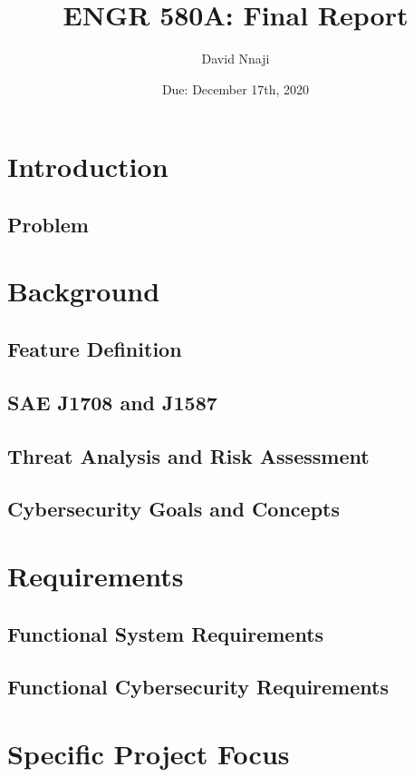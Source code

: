 
\title{ENGR 580A: Final Report}
\author{David Nnaji}
\date{Due: December 17th, 2020}


\maketitle

\section*{Introduction}
	\subsection{Problem}
\section{Background}
	\subsection{Feature Definition}
	\subsection{SAE J1708 and J1587}
	\subsection{Threat Analysis and Risk Assessment}
	\subsection{Cybersecurity Goals and Concepts}

\section{Requirements}
	\subsection{Functional System Requirements}
	\subsection{Functional Cybersecurity Requirements}

\section{Specific Project Focus}

